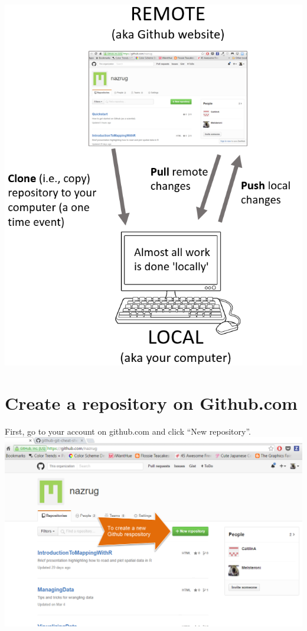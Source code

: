 \documentclass[]{book}
\begin{document}
\includegraphics{img/push_pull_clone.png}

\hypertarget{create-a-repository-on-github.com}{%
\section{Create a repository on Github.com}\label{create-a-repository-on-github.com}}

First, go to your account on github.com and click ``New repository''.
\includegraphics{img/create_repository.png}
\end{document}
